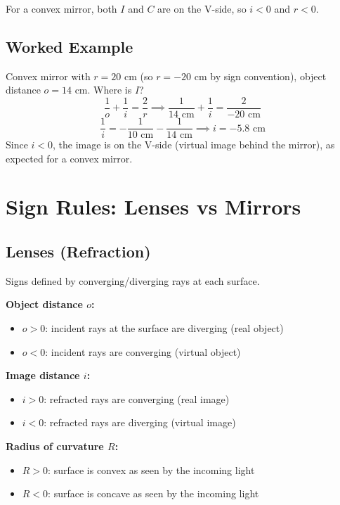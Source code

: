 \documentclass[11pt]{report}
\begin{document}
For a convex mirror, both $I$ and $C$ are on the V-side, so $i < 0$ and $r < 0$.

\subsection*{Worked Example}

Convex mirror with $r = 20$ cm (so $r = -20$ cm by sign convention), object distance $o = 14$ cm. Where is $I$?
\begin{equation}
\frac{1}{o} + \frac{1}{i} = \frac{2}{r} \implies \frac{1}{14\text{ cm}} + \frac{1}{i} = \frac{2}{-20\text{ cm}}
\end{equation}
\begin{equation}
\frac{1}{i} = -\frac{1}{10\text{ cm}} - \frac{1}{14\text{ cm}} \implies i = -5.8\text{ cm}
\end{equation}
Since $i < 0$, the image is on the V-side (virtual image behind the mirror), as expected for a convex mirror.

\section{Sign Rules: Lenses vs Mirrors}

\subsection*{Lenses (Refraction)}

Signs defined by converging/diverging rays at each surface.

\textbf{Object distance $o$:}
\begin{itemize}
    \item $o > 0$: incident rays at the surface are diverging (real object)
    \item $o < 0$: incident rays are converging (virtual object)
\end{itemize}

\textbf{Image distance $i$:}
\begin{itemize}
    \item $i > 0$: refracted rays are converging (real image)
    \item $i < 0$: refracted rays are diverging (virtual image)
\end{itemize}

\textbf{Radius of curvature $R$:}
\begin{itemize}
    \item $R > 0$: surface is convex as seen by the incoming light
    \item $R < 0$: surface is concave as seen by the incoming light
\end{itemize}
\end{document}
